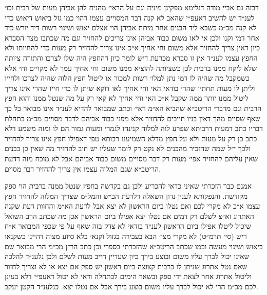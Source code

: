 \documentclass[12pt, openany]{book}
\begin{document}
\begin{multicols}{2}
דבזה גם אביי מודה דגלימא מפקינן מיניה וגם על הראי׳ מהניח להן אביהן מעות של רבית וכו׳ לענ״ד יש להשיב דאעפ״י שהאב לא קנה דבר המסויים עצמו דהוי כמו גזל ביאוש דיאוש כדי לא קנה מכ״מ כשבא ליד הבנים אחר מיתת אביהן הוי אצלם יאוש ושינוי רשות דיד יורש כיד אחר דמי וקנו ולכן אי לאו משום כבוד אביהן אינן צריכים להחזיר וגם מה שכתבו מצד הסברא כיון דאין צריך להחזיר אלא משום וחי אחיך א״כ אינו צריך להחזיר רק מעות כדי להחיותו ולא החפץ עצמו לענ״ד אין זו סברא מכרעת דיש לומר כיון דהחפץ היה שלו לצרכו והתורה ציותה שלא ליקח ממנו ברבית לכן כשציותה להוציא ממנו משום וחי אחיך עמך לא מקויים וחי אלא כשמקבל מה שהיה לו דמי נתן למלו׳ רשות למכור או ליטול חפץ הלוה שהיה לצרכו ולחייו וליתן לו מעות תחתיו שהרי בודאי האי וחי אחיך לאו דוקא שיתן לו כדי חייו שהרי אינו צריך ליטול ממנו יותר ממה שקבל א״כ האי וחי אחיך לא קאי רק על מה שנטל ממנו והוא חפץ הרבית וגם מדברי הריטב״א שהביא הא״מ ראי׳ וכתב שמבואר להדיא לענ״ד אינו מבואר כל כך שאף שסיים מהך דאין בניו חייבים להחזיר אלא מפני כבוד אביהם לדבר מסויים מכ״מ בתחלת דבריו כתב דמעות דרביתא שפרע לוה למלוה קנינהו לגמרי ומעות גמור הם לו ומזה משמע דלא כתב כן רק על מעות ולא על חפץ מדלא השמיענו רבותא טפי דאפילו חפץ אינו צריך להחזיר ולכך י״ל שמה שהזכיר מהבנים לא נקט רק לומר שעליו יש חוב להחזיר מה שאין כן בבנים שאין עליהם להחזיר אפי׳ מעות רק דבר מסויים משום כבוד אביהם אבל לא מוכח מזה דדעת הריטב״א שגם המלוה עצמו אין צריך להחזיר דבר מסוים.\\\vspace{0pt}

אמנם כבר הזכרתי שאיני כדאי להכריע ולכן גם בקדשה בחפץ שנטל ממנה ברבית הוי ספק מקודשת. והנפקותא לענין נדון השאלה דלדעת הב״ש והמל״מ שצריך המלוה להחזיר חפץ עצמו א״כ לא מקרי לכם ואם נטלו ביום הראשון לא יצא אבל לדעת הא״מ והחוות דעת שקנה האתרוג וא״צ לשלם רק דמים אם נטלו יצא אפילו ביום הראשון אכן מה שכתב הרב השואל שיכול ליטלו אפילו ביום הראשון לענ״ד בודאי לא צדק בזה שאף על פי שכפי המבואר א״ח ריש (סי׳ תרמ״ט) לא מקרי מצו׳ הבא בעבירה בגזול וקנא׳ בלא סיוע מצוה דהיינו כשקנאו ביאוש ושינוי מעשה וכמו שכתב הריטב״א שהזכרתי בספרי וכן כתב הר״ן מכ״מ הרי מבואר שם שאינו יכול לברך עליו משום ובוצע בירך כיון שעדיין חייב מעות לשלם ולכן נלענ״ד להלכה שאם נטל אתרוג שניתן לו ברבית קצוצה ביום ראשון יש ספק אם יצא או לא וצריך לחזור וליטול אתרוג אחר לצאת ידי ספק ובשאר הימים לכתחלה ודאי לא יטול דאעפ״י דלא בעינן לכם מכ״מ הרי לא יכול לברך עליו משום בוצע בירך אבל אם נטלו יצא. כנלענ״ד הקטן יעקב.\\\vspace{0pt}

\end{multicols}\newpage
\end{document}
